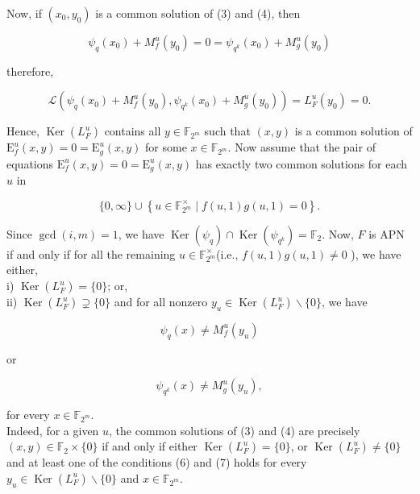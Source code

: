 \documentclass[10pt]{article}
\begin{document}
Now, if $\left(x_{0}, y_{0}\right)$ is a common solution of (3) and (4), then

$$
\psi_{q}\left(x_{0}\right)+M_{f}^{u}\left(y_{0}\right)=0=\psi_{q^{k}}\left(x_{0}\right)+M_{g}^{u}\left(y_{0}\right)
$$

therefore,

$$
\mathcal{L}\left(\psi_{q}\left(x_{0}\right)+M_{f}^{u}\left(y_{0}\right), \psi_{q^{k}}\left(x_{0}\right)+M_{g}^{u}\left(y_{0}\right)\right)=L_{F}^{u}\left(y_{0}\right)=0 .
$$

Hence, $\operatorname{Ker}\left(L_{F}^{u}\right)$ contains all $y \in \mathbb{F}_{2^{m}}$ such that $(x, y)$ is a common solution of $\mathrm{E}_{f}^{u}(x, y)=0=\mathrm{E}_{g}^{u}(x, y)$ for some $x \in \mathbb{F}_{2^{m}}$. Now assume that the pair of equations $\mathrm{E}_{f}^{u}(x, y)= 0=\mathrm{E}_{g}^{u}(x, y)$ has exactly two common solutions for each $u$ in

$$
\{0, \infty\} \cup\left\{u \in \mathbb{F}_{2^{m}}^{\times} \mid f(u, 1) g(u, 1)=0\right\} .
$$

Since $\operatorname{gcd}(i, m)=1$, we have $\operatorname{Ker}\left(\psi_{q}\right) \cap \operatorname{Ker}\left(\psi_{q^{k}}\right)=\mathbb{F}_{2}$. Now, $F$ is APN if and only if for all the remaining $u \in \mathbb{F}_{2^{m}}^{\times}$(i.e., $f(u, 1) g(u, 1) \neq 0$ ), we have either,\\
i) $\operatorname{Ker}\left(L_{F}^{u}\right)=\{0\}$; or,\\
ii) $\operatorname{Ker}\left(L_{F}^{u}\right) \supsetneq\{0\}$ and for all nonzero $y_{u} \in \operatorname{Ker}\left(L_{F}^{u}\right) \backslash\{0\}$, we have


\begin{equation*}
\psi_{q}(x) \neq M_{f}^{u}\left(y_{u}\right) \tag{6}
\end{equation*}


or


\begin{equation*}
\psi_{q^{k}}(x) \neq M_{g}^{u}\left(y_{u}\right), \tag{7}
\end{equation*}


for every $x \in \mathbb{F}_{2^{m}}$.\\
Indeed, for a given $u$, the common solutions of (3) and (4) are precisely $(x, y) \in \mathbb{F}_{2} \times\{0\}$ if and only if either $\operatorname{Ker}\left(L_{F}^{u}\right)= \{0\}$, or $\operatorname{Ker}\left(L_{F}^{u}\right) \neq\{0\}$ and at least one of the conditions (6) and (7) holds for every $y_{u} \in \operatorname{Ker}\left(L_{F}^{u}\right) \backslash\{0\}$ and $x \in \mathbb{F}_{2^{m}}$.
\end{document}
